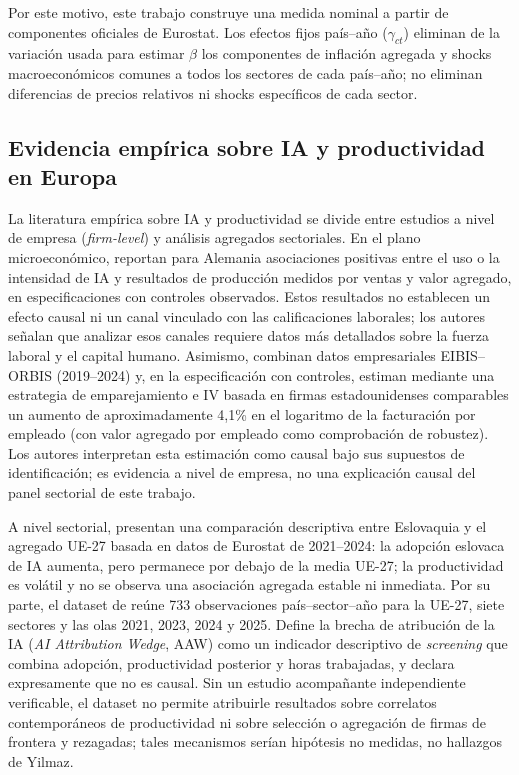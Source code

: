 \documentclass[12pt,a4paper]{article}
\begin{document}
Por este motivo, este trabajo construye una medida nominal a partir de componentes oficiales de Eurostat. Los efectos fijos país--año ($\gamma_{ct}$) eliminan de la variación usada para estimar $\beta$ los componentes de inflación agregada y shocks macroeconómicos comunes a todos los sectores de cada país--año; no eliminan diferencias de precios relativos ni shocks específicos de cada sector.

\subsection{Evidencia empírica sobre IA y productividad en Europa}

La literatura empírica sobre IA y productividad se divide entre estudios a nivel de empresa (\textit{firm-level}) y análisis agregados sectoriales. En el plano microeconómico, \citet{czarnitzki2023firm} reportan para Alemania asociaciones positivas entre el uso o la intensidad de IA y resultados de producción medidos por ventas y valor agregado, en especificaciones con controles observados. Estos resultados no establecen un efecto causal ni un canal vinculado con las calificaciones laborales; los autores señalan que analizar esos canales requiere datos más detallados sobre la fuerza laboral y el capital humano. Asimismo, \citet{aldasoro2026adoption} combinan datos empresariales EIBIS--ORBIS (2019--2024) y, en la especificación con controles, estiman mediante una estrategia de emparejamiento e IV basada en firmas estadounidenses comparables un aumento de aproximadamente 4,1\% en el logaritmo de la facturación por empleado (con valor agregado por empleado como comprobación de robustez). Los autores interpretan esta estimación como causal bajo sus supuestos de identificación; es evidencia a nivel de empresa, no una explicación causal del panel sectorial de este trabajo.

A nivel sectorial, \citet{kadarova2026slovakia} presentan una comparación descriptiva entre Eslovaquia y el agregado UE-27 basada en datos de Eurostat de 2021--2024: la adopción eslovaca de IA aumenta, pero permanece por debajo de la media UE-27; la productividad es volátil y no se observa una asociación agregada estable ni inmediata. Por su parte, el dataset de \citet{yilmaz2026dataset} reúne 733 observaciones país--sector--año para la UE-27, siete sectores y las olas 2021, 2023, 2024 y 2025. Define la brecha de atribución de la IA (\textit{AI Attribution Wedge}, AAW) como un indicador descriptivo de \textit{screening} que combina adopción, productividad posterior y horas trabajadas, y declara expresamente que no es causal. Sin un estudio acompañante independiente verificable, el dataset no permite atribuirle resultados sobre correlatos contemporáneos de productividad ni sobre selección o agregación de firmas de frontera y rezagadas; tales mecanismos serían hipótesis no medidas, no hallazgos de Yilmaz.
\end{document}
